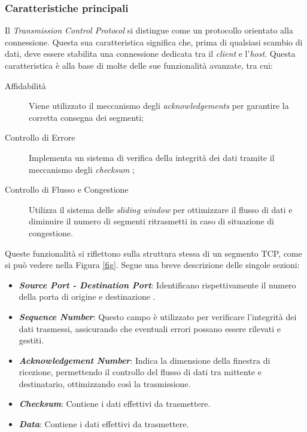 \subsubsection{ Caratteristiche principali} 
\indent Il \emph{Transmission Control Protocol} si distingue come un protocollo orientato alla connessione. Questa sua caratteristica significa che, prima di qualsiasi scambio di dati, deve essere stabilita una connessione dedicata tra il \emph{client \glsfirstoccur} e l'\emph{host\glsfirstoccur}.
Questa caratteristica è alla base di molte delle sue funzionalità avanzate, tra cui:
\begin{description}
    \item[Affidabilità] Viene utilizzato il meccanismo degli \emph{acknowledgements} \glsfirstoccur per garantire la corretta consegna dei segmenti;

    \item[Controllo di Errore] Implementa un sistema di verifica della integrità dei dati tramite il meccanismo degli \emph{checksum} \glsfirstoccur;
    
    \item[Controllo di Flusso e Congestione] Utilizza il sistema delle \emph{sliding window} \glsfirstoccur per ottimizzare il flusso di dati e diminuire il numero di segmenti ritrasmetti in caso di situazione di congestione.
\end{description}

Queste funzionalità si riflettono sulla struttura stessa di un segmento TCP, come si può vedere nella Figura \ref{fig}. Segue una breve descrizione delle singole sezioni:

\begin{itemize}
\item \textit{\textbf{Source Port - Destination Port}}: Identificano rispettivamente il numero della porta di origine e destinazione .
\item \textit{\textbf{Sequence Number}}: Questo campo è utilizzato per verificare l'integrità dei dati trasmessi, assicurando che eventuali errori possano essere rilevati e gestiti.
\item \textit{\textbf{Acknowledgement Number}}: Indica la dimensione della finestra di ricezione, permettendo il controllo del flusso di dati tra mittente e destinatario, ottimizzando così la trasmissione.
\item \textit{\textbf{Checksum}}: Contiene i dati effettivi da trasmettere.
\item \textit{\textbf{Data}}: Contiene i dati effettivi da trasmettere.
\end{itemize}

